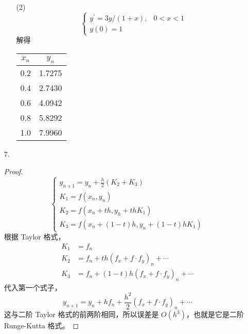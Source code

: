 \documentclass{sjtuarticle}
\begin{document}
\begin{itemize}
\begin{solution}
\begin{itemize}
            \item[(2)] \begin{equation*}
                \begin{cases}
                    y^\prime = 3y/(1+x),&0<x<1\\
                    y(0)=1
                \end{cases}
            \end{equation*} 
            解得
            \begin{table}[h]
                \centering
                \begin{tabular}{cc}
                    \toprule
                    $x_n$ & $y_n$ \\
                    \midrule
                    0.2 & 1.7275 \\
                    0.4 & 2.7430 \\
                    0.6 & 4.0942 \\
                    0.8 & 5.8292 \\
                    1.0 & 7.9960 \\
                    \bottomrule
                \end{tabular}
            \end{table}
        \end{itemize}
    \end{solution}

    \item[7.] \begin{proof}
        \begin{equation*}
            \begin{cases}
                y_{n+1}=y_n+\frac{h}{2}(K_2+K_3)\\
                K_1=f(x_n,y_n)\\
                K_2=f(x_n+th,y_h+thK_1)\\
                K_3=f(x_n+(1-t)h,y_n+(1-t)hK_1)
            \end{cases}
        \end{equation*}
        根据 Taylor 格式，
        \begin{align*}
            K_1&=f_n\\
            K_2&=f_n+th(f_x+f\cdot f_y)_n+\cdots\\
            K_3&=f_n+(1-t)h(f_x+f\cdot f_y)_n+\cdots
        \end{align*}
        代入第一个式子，
        \begin{equation*}
            y_{n+1}=y_n+hf_n+\frac{h^2}{2}(f_x+f\cdot f_y)_n+\cdots
        \end{equation*}
        这与二阶 Taylor 格式的前两阶相同，所以误差是 $O(h^3)$，也就是它是二阶 Runge-Kutta 格式。
    \end{proof}


\end{itemize}
\end{document}
